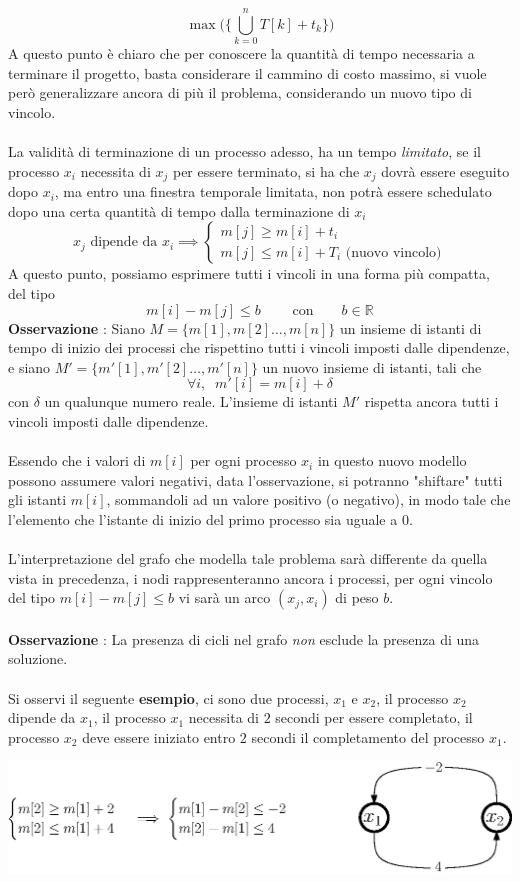 \documentclass[12pt, letterpaper]{article}
\newcommand{\acc}{\\\hphantom{}\\}
\begin{document}
$$ \max\Big(\big\{\bigcup_{k=0}^n T[k]+t_k\big\}\Big)$$
A questo punto è chiaro che per conoscere la quantità di tempo necessaria a terminare il progetto, basta considerare il cammino 
di costo massimo, si vuole però generalizzare ancora di più il problema, considerando un nuovo tipo di vincolo.\acc 
La validità di terminazione di un processo adesso, ha un tempo \textit{limitato}, se il processo $x_i$ necessita di 
$x_j$ per essere terminato, si ha che $x_j$ dovrà essere eseguito dopo $x_i$, ma entro una finestra temporale limitata,
non potrà essere schedulato dopo una certa quantità di tempo dalla terminazione di $x_i$ 
$$
    x_j \text{ dipende da }x_i \implies \begin{cases}
    m[j] \ge m[i]+t_i \\
    m[j] \le m[i] + T_i \text{ (nuovo vincolo)}\end{cases}
 $$
 A questo punto, possiamo esprimere tutti i vincoli in una forma più compatta, del tipo 
 $$ m[i]-m[j]\le b\;\;\;\;\;\;\;\text{ con }\;\;\;\;\;\;b\in \mathbb{R} $$
\textbf{Osservazione} : Siano $M=\{m[1],m[2]\dots,m[n]\}$ un insieme di istanti di tempo di inizio dei processi che rispettino 
tutti i vincoli imposti dalle dipendenze, e siano $M'=\{m'[1],m'[2]\dots,m'[n]\}$ un nuovo insieme di istanti, tali che 
$$\forall i,\;\;m'[i]=m[i]+\delta$$ con $\delta$ un qualunque numero reale. L'insieme di istanti $M'$ rispetta ancora tutti i 
vincoli imposti dalle dipendenze.\acc 
Essendo che i valori di $m[i]$ per ogni processo $x_i$ in questo nuovo modello possono assumere valori negativi, data 
l'osservazione, si potranno "shiftare" tutti gli istanti $m[i]$, sommandoli ad un valore positivo (o negativo), in modo 
tale che l'elemento che l'istante di inizio del primo processo sia uguale a 0.\acc 
L'interpretazione del grafo che modella tale problema sarà differente da quella vista in precedenza, i nodi rappresenteranno 
ancora i processi, per ogni vincolo 
del tipo $m[i]-m[j]\le b$ vi sarà un arco $(x_j,x_i)$ di peso $b$. \acc 
\textbf{Osservazione} : La presenza di cicli nel grafo \textit{non} esclude la presenza di una soluzione.\acc 
Si osservi il seguente \textbf{esempio}, ci sono due processi, $x_1$ e $x_2$, il processo $x_2$ dipende da $x_1$, 
il processo $x_1$ necessita di 
$2$ secondi per essere completato, il processo $x_2$ deve essere iniziato entro $2$ secondi il completamento del 
processo $x_1$. \begin{center}
    \includegraphics[width=1\textwidth ]{images/scheduling2.eps}
\end{center}
\end{document}
